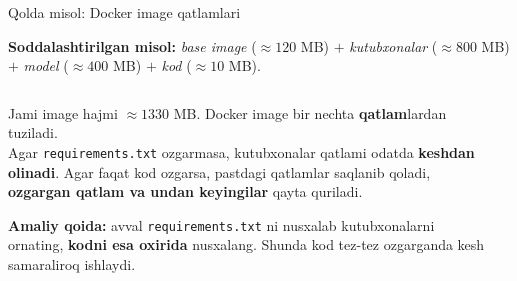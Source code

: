 \documentclass[aspectratio=169,11pt]{beamer}
\newcommand{\uzq}{\textquotesingle{}}   %
\begin{document}
\begin{frame}{Qo\uzq{}lda misol: Docker image qatlamlari}
  \small

  \begin{tcolorbox}[defbox]
    \footnotesize
    \textbf{Soddalashtirilgan misol:}
    \textit{base image} ($\approx 120$ MB)
    $+$ \textit{kutubxonalar} ($\approx 800$ MB)
    $+$ \textit{model} ($\approx 400$ MB)
    $+$ \textit{kod} ($\approx 10$ MB).
  \end{tcolorbox}

  \vspace{2pt}

  \begin{columns}[T,totalwidth=\textwidth]
    \begin{column}{0.55\textwidth}
      \footnotesize

      Jami image hajmi $\approx 1330$ MB. Docker image bir nechta
      \textbf{qatlam}lardan tuziladi.\\[4pt]

      Agar \texttt{requirements.txt} o\uzq{}zgarmasa, kutubxonalar qatlami
      odatda \textbf{keshdan olinadi}. Agar faqat kod o\uzq{}zgarsa,
      pastdagi qatlamlar saqlanib qoladi, \textbf{o\uzq{}zgargan qatlam va undan
      keyingilar} qayta quriladi.\\[5pt]

      \begin{tcolorbox}[okbox,top=2pt,bottom=2pt,left=3pt,right=3pt]
        \footnotesize
        \textbf{Amaliy qoida:}
        avval \texttt{requirements.txt} ni nusxalab kutubxonalarni
        o\uzq{}rnating, \textbf{kodni esa oxirida} nusxalang.
        Shunda kod tez-tez o\uzq{}zgarganda kesh samaraliroq ishlaydi.
      \end{tcolorbox}
    \end{column}

    \begin{column}{0.42\textwidth}
      \centering
\end{column}
\end{columns}
\end{frame}
\end{document}
